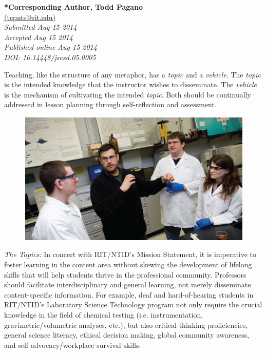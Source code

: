 \documentclass[11.5pt]{sig-alternate} %
\begin{document}
\textbf{*Corresponding Author, Todd Pagano}\\
\href{mailto:tepnts@rit.edu}{(tepnts@rit.edu)} \\
\textit{Submitted  Aug 15 2014 }\\
\textit{Accepted  Aug 15 2014} \\
\textit{Published online Aug 15 2014} \\
\textit{DOI: 10.14448/jsesd.05.0005} \\
\pagebreak
\clearpage
\begin{large}

Teaching, like the structure of any metaphor, has a \textit{topic} and a \textit{vehicle}. The \textit{topic} is the intended knowledge that the instructor wishes to disseminate. The \textit{vehicle} is the mechanism of cultivating the intended \textit{topic}. Both should be continually addressed in lesson planning through self-reflection and assessment.

\begin{figure}[h]
    \centering
    \includegraphics[width=1\linewidth]{fig2.png}
\end{figure}

\textit{The Topics:} In concert with RIT/NTID’s Mission Statement, it is imperative to foster learning in the content area without skewing the development of lifelong skills that will help students thrive in the professional community. Professors should facilitate interdisciplinary and general learning, not merely disseminate content-specific information. For example, deaf and hard-of-hearing students in RIT/NTID’s Laboratory Science Technology program not only require the crucial knowledge in the field of chemical testing (i.e. instrumentation, gravimetric/volumetric analyses, etc.), but also critical thinking proficiencies, general science literacy, ethical decision making, global community awareness, and self-advocacy/workplace survival skills.


\end{large}
\end{document}
